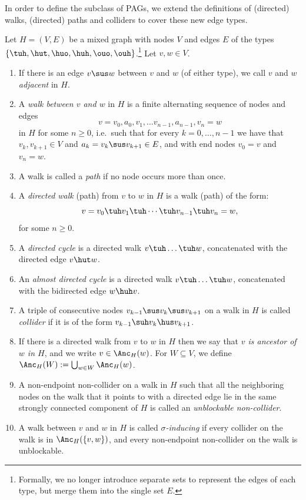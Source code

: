 In order to define the subclass of PAGs, we extend the definitions of (directed) walks, (directed) paths and colliders to cover these new edge types.
\begin{Def}\label{def:more_walks}
  Let $H=(V,E)$ be a mixed graph with nodes $V$ and edges $E$ of the types $\{\tuh,\hut,\huo,\huh,\ouo,\ouh\}$.\footnote{Formally, we no longer introduce separate sets to represent the edges of each type, but merge them into the single set $E$.}
  Let $v,w \in V$.
  \begin{enumerate}
    \item If there is an edge $v \sus w$ between $v$ and $w$ (of either type), we call $v$ and $w$ \emph{adjacent} in $H$.
    \item A \emph{walk between $v$ and $w$} in $H$ is a finite alternating sequence of nodes and edges 
        \[v=v_0, a_0, v_1, \dots v_{n-1}, a_{n-1}, v_n=w\] 
        in $H$ for some $n \ge 0$, i.e.\ such that for every $k=0,\dots,n-1$ 
        we have that $v_{k},v_{k+1} \in V$ and $a_k = v_k \sus v_{k+1} \in E$, and with end nodes $v_0=v$ and $v_n=w$.
    \item A walk is called a \emph{path} if no node occurs more than once.
    \item A \emph{directed walk} (path) from $v$ to $w$ in $H$ is a walk (path) of the form:
        \[v=v_0 \tuh v_1 \tuh  \cdots \tuh v_{n-1} \tuh v_n=w,\]
        for some $n \ge 0$.
    \item A \emph{directed cycle} is a directed walk $v \tuh \dots \tuh w$, concatenated with
      the directed edge $v \hut w$.
    \item An \emph{almost directed cycle} is a directed walk $v \tuh \dots \tuh w$, concatenated
      with the bidirected edge $w \huh v$.
    \item A triple of consecutive nodes $v_{k-1} \sus v_k \sus v_{k+1}$ on a walk in $H$ is called \emph{collider}
      if it is of the form $v_{k-1} \suh v_k \hus v_{k+1}$.
    \item If there is a directed walk from $v$ to $w$ in $H$ then we say that \emph{$v$ is ancestor of $w$ in $H$}, 
      and we write $v \in \Anc_H(w)$. For $W \subseteq V$, we define $\Anc_H(W) := \bigcup_{w\in W} \Anc_H(w)$.
    \item A non-endpoint non-collider on a walk in $H$ such that all the neighboring nodes on the walk that it points to with a directed edge lie in the same strongly connected component of $H$ is called an \emph{unblockable non-collider}.
    \item A walk between $v$ and $w$ in $H$ is called \emph{$\sigma$-inducing} if every collider on the walk is in $\Anc_H(\{v,w\})$, and every non-endpoint non-collider on the walk is unblockable.
  \end{enumerate}
\end{Def}
